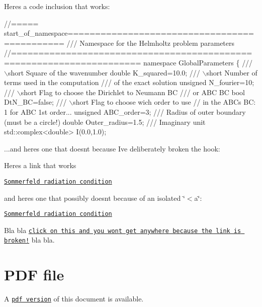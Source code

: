 Here\textquotesingle{}s a code inclusion that works\+:

 
\begin{DoxyCodeInclude}
\textcolor{comment}{//===== start\_of\_namespace=============================================}
\textcolor{comment}{/// Namespace for the Helmholtz problem parameters}
\textcolor{comment}{}\textcolor{comment}{//=====================================================================}
\textcolor{keyword}{namespace }GlobalParameters
\{\textcolor{comment}{}
\textcolor{comment}{ /// \(\backslash\)short Square of the wavenumber}
\textcolor{comment}{} \textcolor{keywordtype}{double} K\_squared=10.0; 
 \textcolor{comment}{}
\textcolor{comment}{ /// \(\backslash\)short Number of terms used in the computation }
\textcolor{comment}{ /// of the exact solution}
\textcolor{comment}{} \textcolor{keywordtype}{unsigned} N\_fourier=10;
 \textcolor{comment}{}
\textcolor{comment}{ /// \(\backslash\)short Flag to choose the Dirichlet to Neumann BC}
\textcolor{comment}{ /// or ABC BC}
\textcolor{comment}{} \textcolor{keywordtype}{bool} DtN\_BC=\textcolor{keyword}{false};
\textcolor{comment}{}
\textcolor{comment}{ /// \(\backslash\)short Flag to choose wich order to use}
\textcolor{comment}{} \textcolor{comment}{// in the ABCs BC: 1 for ABC 1st order...}
 \textcolor{keywordtype}{unsigned} ABC\_order=3;
\textcolor{comment}{}
\textcolor{comment}{ /// Radius of outer boundary (must be a circle!)}
\textcolor{comment}{} \textcolor{keywordtype}{double} Outer\_radius=1.5;
\textcolor{comment}{}
\textcolor{comment}{ /// Imaginary unit }
\textcolor{comment}{} std::complex<double> I(0.0,1.0);

\end{DoxyCodeInclude}


...and here\textquotesingle{}s one that doesn\textquotesingle{}t because I\textquotesingle{}ve deliberately broken the hook\+:

 
\begin{DoxyCodeInclude}

\end{DoxyCodeInclude}


Here\textquotesingle{}s a link that works

\href{http://en.wikipedia.org/wiki/Sommerfeld_radiation_condition}{\tt Sommerfeld radiation condition}

and here\textquotesingle{}s one that possibly doesn\textquotesingle{}t because of an isolated \char`\"{}$<$a\char`\"{}\+:

\href{http://en.wikipedia.org/wiki/Sommerfeld_radiation_condition}{\tt Sommerfeld radiation condition}

Bla bla \href{http://www.maths.man.ac.uk/~mheil/page_doesnt_exist}{\tt click on this and you won\textquotesingle{}t get anywhere because the link is broken!} bla bla.



 

 \hypertarget{index_pdf}{}\section{P\+D\+F file}\label{index_pdf}
A \href{../latex/refman.pdf}{\tt pdf version} of this document is available. 
